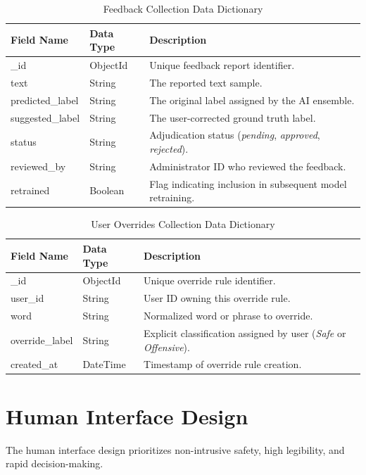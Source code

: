 \documentclass[A4paper,12pt]{report}
\theoremstyle{plain}
\theoremstyle{definition}
\theoremstyle{remark}
\numberwithin{equation}{section}
\begin{document}
\begin{table}[H]
\centering
\caption{Feedback Collection Data Dictionary}
\label{tab:feed_dict}
\renewcommand{\arraystretch}{1.3}
\begin{tabular}{|p{3cm}|p{2.5cm}|p{8.5cm}|}
\hline
\textbf{Field Name} & \textbf{Data Type} & \textbf{Description} \\ \hline
\_id & ObjectId & Unique feedback report identifier. \\ \hline
text & String & The reported text sample. \\ \hline
predicted\_label & String & The original label assigned by the AI ensemble. \\ \hline
suggested\_label & String & The user-corrected ground truth label. \\ \hline
status & String & Adjudication status (\textit{pending}, \textit{approved}, \textit{rejected}). \\ \hline
reviewed\_by & String & Administrator ID who reviewed the feedback. \\ \hline
retrained & Boolean & Flag indicating inclusion in subsequent model retraining. \\ \hline
\end{tabular}
\end{table}

\begin{table}[H]
\centering
\caption{User Overrides Collection Data Dictionary}
\label{tab:override_dict}
\renewcommand{\arraystretch}{1.3}
\begin{tabular}{|p{3cm}|p{2.5cm}|p{8.5cm}|}
\hline
\textbf{Field Name} & \textbf{Data Type} & \textbf{Description} \\ \hline
\_id & ObjectId & Unique override rule identifier. \\ \hline
user\_id & String & User ID owning this override rule. \\ \hline
word & String & Normalized word or phrase to override. \\ \hline
override\_label & String & Explicit classification assigned by user (\textit{Safe} or \textit{Offensive}). \\ \hline
created\_at & DateTime & Timestamp of override rule creation. \\ \hline
\end{tabular}
\end{table}

\section{Human Interface Design}
The human interface design prioritizes non-intrusive safety, high legibility, and rapid decision-making.
\end{document}
